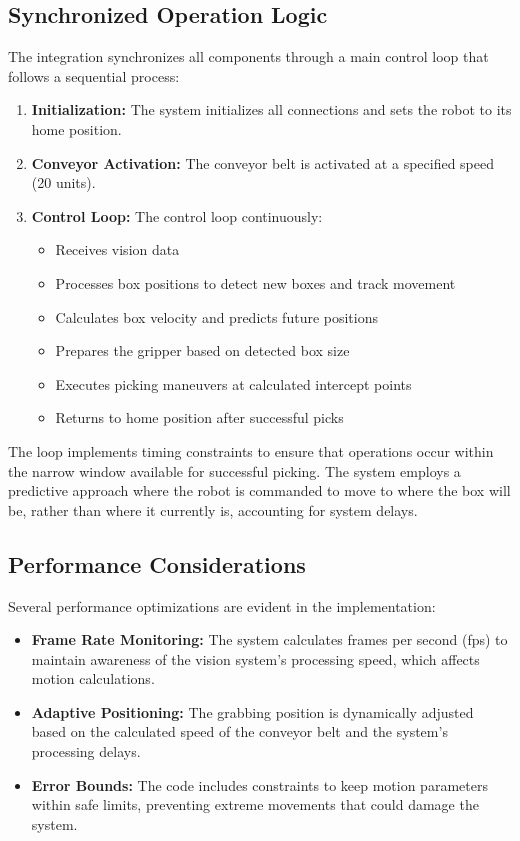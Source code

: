 \documentclass[a4paper, 10pt]{article}
\begin{document}
\subsection{Synchronized Operation Logic}
The integration synchronizes all components through a main control loop that follows a sequential process:
\begin{enumerate}
    \item \textbf{Initialization:} The system initializes all connections and sets the robot to its home position.
    \item \textbf{Conveyor Activation:} The conveyor belt is activated at a specified speed (20 units).
    \item \textbf{Control Loop:} The control loop continuously:
    \begin{itemize}
        \item Receives vision data
        \item Processes box positions to detect new boxes and track movement
        \item Calculates box velocity and predicts future positions
        \item Prepares the gripper based on detected box size
        \item Executes picking maneuvers at calculated intercept points
        \item Returns to home position after successful picks
    \end{itemize}
\end{enumerate}

The loop implements timing constraints to ensure that operations occur within the narrow window available for successful picking. The system employs a predictive approach where the robot is commanded to move to where the box will be, rather than where it currently is, accounting for system delays.

\subsection{Performance Considerations}
Several performance optimizations are evident in the implementation:
\begin{itemize}
    \item \textbf{Frame Rate Monitoring:} The system calculates frames per second (fps) to maintain awareness of the vision system's processing speed, which affects motion calculations.
    \item \textbf{Adaptive Positioning:} The grabbing position is dynamically adjusted based on the calculated speed of the conveyor belt and the system's processing delays.
    \item \textbf{Error Bounds:} The code includes constraints to keep motion parameters within safe limits, preventing extreme movements that could damage the system.
\end{itemize}
\end{document}
